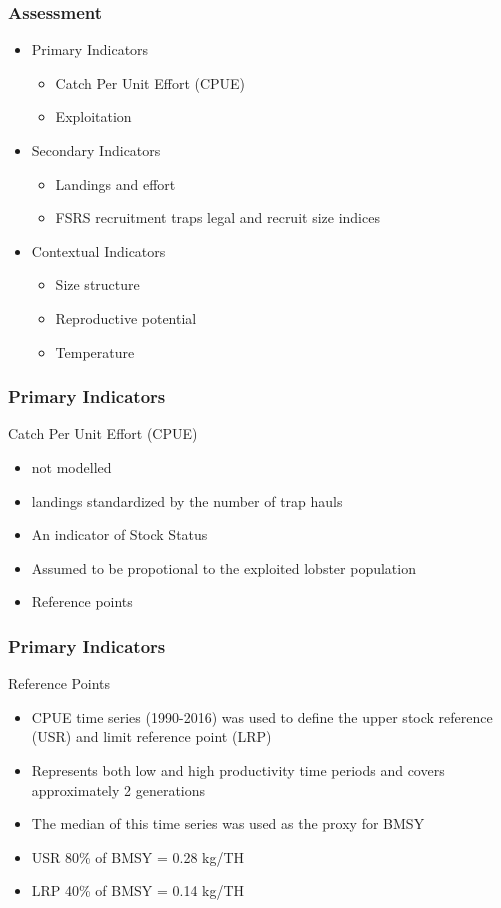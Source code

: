 \documentclass{beamer}
\begin{document}
\begin{frame}
\frametitle{Assessment}
\begin{itemize}
\item Primary Indicators 
\begin{itemize}
\item Catch Per Unit Effort (CPUE)
\item Exploitation
\end{itemize}
\item Secondary Indicators 
\begin{itemize}
\item Landings and effort
\item FSRS recruitment traps legal and recruit size indices
\end{itemize}
\item Contextual Indicators
\begin{itemize}
\item Size structure
\item Reproductive potential
\item Temperature
\end{itemize}
\end{itemize}

\end{frame}



\begin{frame}
\frametitle{Primary Indicators}
Catch Per Unit Effort (CPUE)
\begin{itemize}
\item not modelled 
\item landings standardized by the number of trap hauls 
\item An indicator of Stock Status 
\item Assumed to be propotional to the exploited lobster population 
\item Reference points 
\end{itemize}
\end{frame}

\begin{frame}
\frametitle{Primary Indicators}
Reference Points
\begin{itemize}
\item CPUE time series (1990-2016) was used to define the upper stock reference (USR) and limit reference point (LRP) 
\item Represents both low and high productivity time periods and covers approximately 2 generations 
\item The median of this time series was used as the proxy for BMSY 
\item USR 80\% of BMSY = 0.28 kg/TH
\item LRP 40\% of BMSY = 0.14 kg/TH
\end{itemize}
\end{frame}
\end{document}
